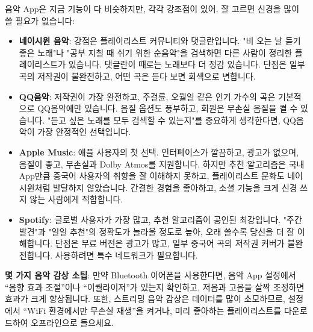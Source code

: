 


음악 App은 지금 기능이 다 비슷하지만, 각각 강조점이 있어, 잘 고르면 신경을 많이 쓸 필요가 없습니다:

\begin{itemize}
  \item \textbf{네이시윈 음악}: 강점은 플레이리스트 커뮤니티와 댓글란입니다. "비 오는 날 듣기 좋은 노래"나 "공부 지칠 때 쉬기 위한 순음악"을 검색하면 다른 사람이 정리한 플레이리스트가 있습니다. 댓글란이 때로는 노래보다 더 정감 있습니다. 단점은 일부 곡의 저작권이 불완전하고, 어떤 곡은 듣다 보면 회색으로 변합니다.
  \item \textbf{QQ음악}: 저작권이 가장 완전하고, 주걸륜, 오월일 같은 인기 가수의 곡은 기본적으로 QQ음악에만 있습니다. 음질 옵션도 풍부하고, 회원은 무손실 음질을 켤 수 있습니다. "듣고 싶은 노래를 모두 검색할 수 있는지"를 중요하게 생각한다면, QQ음악이 가장 안정적인 선택입니다.
  \item \textbf{Apple Music}: 애플 사용자의 첫 선택. 인터페이스가 깔끔하고, 광고가 없으며, 음질이 좋고, 무손실과 Dolby Atmos를 지원합니다. 하지만 추천 알고리즘은 국내 App만큼 중국어 사용자의 취향을 잘 이해하지 못하고, 플레이리스트 문화도 네이시윈처럼 발달하지 않았습니다. 간결한 경험을 좋아하고, 소셜 기능을 크게 신경 쓰지 않는 사람에게 적합합니다.
  \item \textbf{Spotify}: 글로벌 사용자가 가장 많고, 추천 알고리즘이 공인된 최강입니다. "주간 발견"과 "일일 추천"의 정확도가 놀라울 정도로 높아, 오래 쓸수록 당신을 더 잘 이해합니다. 단점은 무료 버전은 광고가 많고, 일부 중국어 곡의 저작권 커버가 불완전합니다. 사용하려면 특수 네트워크가 필요합니다.
\end{itemize}

\textbf{몇 가지 음악 감상 소팁}: 만약 Bluetooth 이어폰을 사용한다면, 음악 App 설정에서 “음향 효과 조절”이나 “이퀄라이저”가 있는지 확인하고, 저음과 고음을 살짝 조정하면 효과가 크게 향상됩니다. 또한, 스트리밍 음악 감상은 데이터를 많이 소모하므로, 설정에서 “WiFi 환경에서만 무손실 재생”을 켜거나, 미리 좋아하는 플레이리스트를 다운로드하여 오프라인으로 들으세요.

